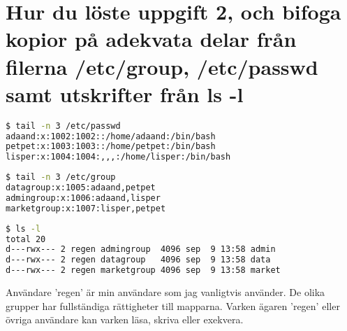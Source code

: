 \documentclass[11pt]{article}
\begin{document}
\pagebreak

\section{Hur du löste uppgift 2, och bifoga kopior på adekvata delar från filerna /etc/group, /etc/passwd samt utskrifter från ls -l}

\begin{lstlisting}[language=bash,caption={Utdrag från /etc/passwd}]
$ tail -n 3 /etc/passwd
adaand:x:1002:1002::/home/adaand:/bin/bash
petpet:x:1003:1003::/home/petpet:/bin/bash
lisper:x:1004:1004:,,,:/home/lisper:/bin/bash
\end{lstlisting}


\begin{lstlisting}[language=bash,caption={Utdrag från /etc/group}]
$ tail -n 3 /etc/group
datagroup:x:1005:adaand,petpet
admingroup:x:1006:adaand,lisper
marketgroup:x:1007:lisper,petpet
\end{lstlisting}

\begin{lstlisting}[language=bash,caption={Resultat av ls -l}]
$ ls -l
total 20
d---rwx--- 2 regen admingroup  4096 sep  9 13:58 admin
d---rwx--- 2 regen datagroup   4096 sep  9 13:58 data
d---rwx--- 2 regen marketgroup 4096 sep  9 13:58 market
\end{lstlisting}

Användare 'regen' är min användare som jag vanligtvis använder. De olika grupper har fullständiga rättigheter till mapparna. Varken ägaren 'regen' eller övriga användare kan varken läsa, skriva eller exekvera.
\end{document}
